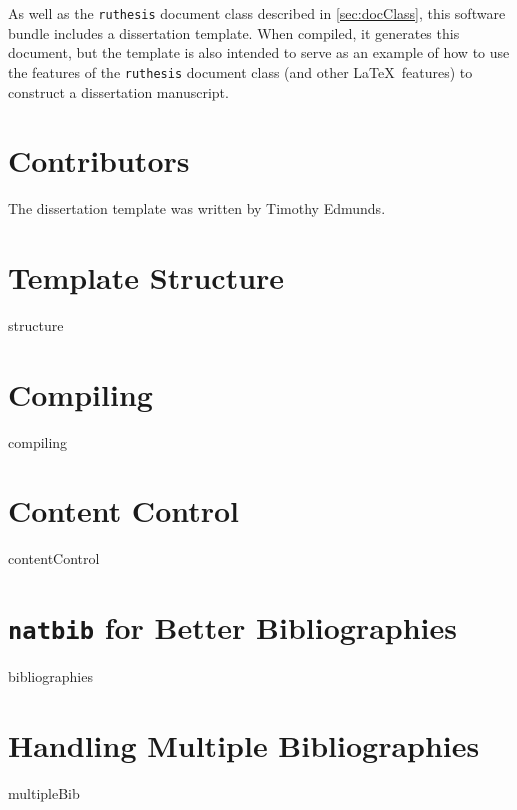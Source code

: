 As well as the \texttt{ruthesis} document class described in \autoref{sec:docClass}, this software bundle includes a dissertation template.
When compiled, it generates this document, but the template is also intended to serve as an example of how to use the features of the \texttt{ruthesis} document class (and other \LaTeX\ features) to construct a dissertation manuscript.

\section{Contributors}
The dissertation template was written by Timothy Edmunds.

\section{Template Structure}
\label{sec:templateStructure:structure}%
{structure}%

\section{Compiling}
\label{sec:templateStructure:compiling}%
{compiling}

\section{Content Control}
\label{sec:templateStructure:contentControl}%
{contentControl}%

\section{\texttt{natbib} for Better Bibliographies}
\label{sec:templateStructure:natbib}%
{bibliographies}%

\section{Handling Multiple Bibliographies}
\label{sec:templateStructure:multibleBib}%
{multipleBib}%